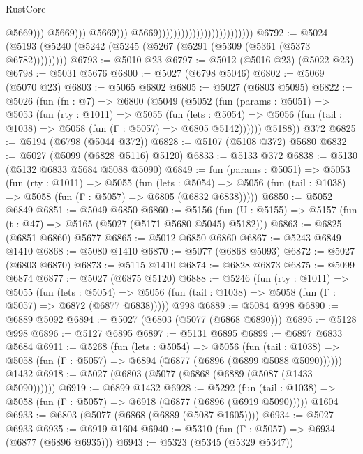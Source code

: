 \begin{lexlean}{RustCore}
\begin{coremodule}
                                                                        @5669)))
                                                                  @5669)))
                                                            @5669)))
                                                      @5669)))))))))))))))))))))))))
@6792 := @5024 (@5193 (@5240 (@5242 (@5245 (@5267 (@5291 (@5309 (@5361 (@5373 @6782)))))))))
@6793 := @5010 @23
@6797 := @5012 (@5016 @23) (@5022 @23)
@6798 := @5031 @5676
@6800 := @5027 (@6798 @5046)
@6802 := @5069 (@5070 @23)
@6803 := @5065 @6802
@6805 := @5027 (@6803 @5095)
@6822 := @5026
    (fun (fn : @7) =>
    @6800
      (@5049
        (@5052
          (fun (params : @5051) =>
          @5053
            (fun (rty : @1011) =>
            @5055
              (fun (lets : @5054) =>
              @5056 (fun (tail : @1038) => @5058 (fun (Γ : @5057) => @6805 @5142))))))
        @5188))
    @372
@6825 := @5194 (@6798 (@5044 @372))
@6828 := @5107 (@5108 @372) @5680
@6832 := @5027 (@5099 (@6828 @5116) @5120)
@6833 := @5133 @372
@6838 := @5130 (@5132 @6833 @5684 @5088 @5090)
@6849 := fun (params : @5051) =>
  @5053
    (fun (rty : @1011) =>
    @5055
      (fun (lets : @5054) =>
      @5056 (fun (tail : @1038) => @5058 (fun (Γ : @5057) => @6805 (@6832 @6838)))))
@6850 := @5052 @6849
@6851 := @5049 @6850
@6860 := @5156 (fun (U : @5155) => @5157 (fun (t : @47) => @5165 (@5027 (@5171 @5680 @5045) @5182)))
@6863 := @6825 (@6851 @6860) @5677
@6865 := @5012 @6850 @6860
@6867 := @5243 @6849 @1410
@6868 := @5080 @1410
@6870 := @5077 (@6868 @5093)
@6872 := @5027 (@6803 @6870)
@6873 := @5115 @1410
@6874 := @6828 @6873
@6875 := @5099 @6874
@6877 := @5027 (@6875 @5120)
@6888 := @5246
    (fun (rty : @1011) =>
    @5055
      (fun (lets : @5054) =>
      @5056 (fun (tail : @1038) => @5058 (fun (Γ : @5057) => @6872 (@6877 @6838)))))
    @998
@6889 := @5084 @998
@6890 := @6889 @5092
@6894 := @5027 (@6803 (@5077 (@6868 @6890)))
@6895 := @5128 @998
@6896 := @5127 @6895
@6897 := @5131 @6895
@6899 := @6897 @6833 @5684
@6911 := @5268
    (fun (lets : @5054) =>
    @5056
      (fun (tail : @1038) => @5058 (fun (Γ : @5057) => @6894 (@6877 (@6896 (@6899 @5088 @5090))))))
    @1432
@6918 := @5027 (@6803 (@5077 (@6868 (@6889 (@5087 (@1433 @5090))))))
@6919 := @6899 @1432
@6928 := @5292
    (fun (tail : @1038) => @5058 (fun (Γ : @5057) => @6918 (@6877 (@6896 (@6919 @5090)))))
    @1604
@6933 := @6803 (@5077 (@6868 (@6889 (@5087 @1605))))
@6934 := @5027 @6933
@6935 := @6919 @1604
@6940 := @5310 (fun (Γ : @5057) => @6934 (@6877 (@6896 @6935)))
@6943 := @5323 (@5345 (@5329 @5347))

\end{coremodule}
\end{lexlean}
